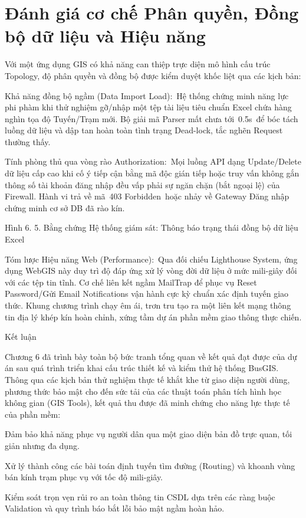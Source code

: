 \documentclass[13pt,a4paper]{report}
\begin{document}
\section{Đánh giá cơ chế Phân quyền, Đồng bộ dữ liệu và Hiệu năng}

Với một ứng dụng GIS có khả năng can thiệp trực diện mô hình cấu trúc Topology, độ phân quyền và đồng bộ được kiểm duyệt khốc liệt qua các kịch bản:

Khả năng đồng bộ ngầm (Data Import Load): Hệ thống chứng minh năng lực phi phàm khi thử nghiệm gỡ/nhập một tệp tài liệu tiêu chuẩn Excel chứa hàng nghìn tọa độ Tuyến/Trạm mới. Bộ giải mã Parser mất chưa tới 0.5s để bóc tách luồng dữ liệu và dập tan hoàn toàn tình trạng Dead-lock, tắc nghẽn Request thường thấy.

Tính phòng thủ qua vòng rào Authorization: Mọi luồng API dạng Update/Delete dữ liệu cấp cao khi cố ý tiếp cận bằng mã độc gián tiếp hoặc truy vấn không gắn thông số tài khoản đăng nhập đều vấp phải sự ngăn chặn (bắt ngoại lệ) của Firewall. Hành vi trả về mã 403 Forbidden hoặc nhảy về Gateway Đăng nhập chứng minh cơ sở DB đã rào kín.

Hình 6. 5. Bằng chứng Hệ thống giám sát: Thông báo trạng thái đồng bộ dữ liệu Excel

Tóm lược Hiệu năng Web (Performance): Qua đối chiếu Lighthouse System, ứng dụng WebGIS này duy trì độ đáp ứng xử lý vòng đời dữ liệu ở mức mili-giây đối với các tệp tin tĩnh. Cơ chế liên kết ngầm MailTrap để phục vụ Reset Password/Gửi Email Notifications vận hành cực kỳ chuẩn xác định tuyến giao thức. Khung chương trình chạy êm ái, trơn tru tạo ra một liên kết mạng thông tin địa lý khép kín hoàn chỉnh, xứng tầm dự án phần mềm giao thông thực chiến.

Kết luận

Chương 6 đã trình bày toàn bộ bức tranh tổng quan về kết quả đạt được của dự án sau quá trình triển khai cấu trúc thiết kế và kiểm thử hệ thống BusGIS. Thông qua các kịch bản thử nghiệm thực tế khắt khe từ giao diện người dùng, phương thức bảo mật cho đến sức tải của các thuật toán phân tích hình học không gian (GIS Tools), kết quả thu được đã minh chứng cho năng lực thực tế của phần mềm:

Đảm bảo khả năng phục vụ người dân qua một giao diện bản đồ trực quan, tối giản nhưng đa dụng.

Xử lý thành công các bài toán định tuyến tìm đường (Routing) và khoanh vùng bán kính trạm phục vụ với tốc độ mili-giây.

Kiểm soát trọn vẹn rủi ro an toàn thông tin CSDL dựa trên các ràng buộc Validation và quy trình báo bắt lỗi bảo mật ngầm hoàn hảo.
\end{document}
